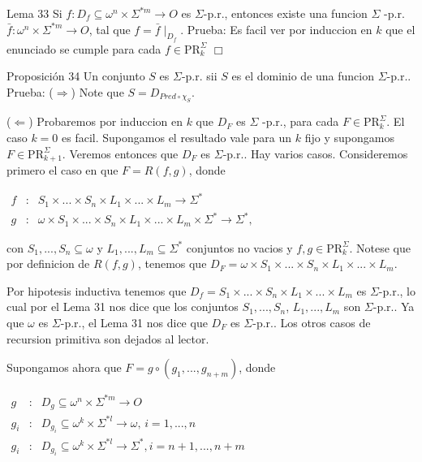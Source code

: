Lema 33 Si \(f:D_{f}\subseteq \omega ^{n}\times \Sigma ^{\ast m}\rightarrow O\) es \(\Sigma \)-p.r., entonces existe una funcion \(\Sigma \) -p.r. \(\bar{f}:\omega ^{n}\times \Sigma ^{\ast m}\rightarrow O\), tal que \(f= \bar{f}\mid _{D_{f}}\).
Prueba: Es facil ver por induccion en \(k\) que el enunciado se cumple para cada \(f\in \mathrm{PR}_{k}^{\Sigma }\) \(\Box\)

Proposición 34 Un conjunto \(S\) es \(\Sigma \)-p.r. sii \(S\) es el dominio de una funcion \(\Sigma \)-p.r.\(.\)
Prueba: (\(\Rightarrow \)) Note que \(S=D_{Pred\circ \chi _{S}}.\)

(\(\Leftarrow \)) Probaremos por induccion en \(k\) que \(D_{F}\) es \(\Sigma \) -p.r., para cada \(F\in \mathrm{PR}_{k}^{\Sigma }.\) El caso \(k=0\) es facil\(.\) Supongamos el resultado vale para un \(k\) fijo y supongamos \(F\in \mathrm{PR} _{k+1}^{\Sigma }.\) Veremos entonces que \(D_{F}\) es \(\Sigma \)-p.r.. Hay varios casos. Consideremos primero el caso en que \(F=R(f,g)\), donde

\(\displaystyle \begin{array}{rcl} f & :& S_{1}\times ...\times S_{n}\times L_{1}\times ...\times L_{m}\rightarrow \Sigma ^{\ast } \\ g & :& \omega \times S_{1}\times ...\times S_{n}\times L_{1}\times ...\times L_{m}\times \Sigma ^{\ast }\rightarrow \Sigma ^{\ast }, \end{array} \)

con \(S_{1},...,S_{n}\subseteq \omega \) y \(L_{1},...,L_{m}\subseteq \Sigma ^{\ast }\) conjuntos no vacios y \(f,g\in \mathrm{PR}_{k}^{\Sigma }\). Notese que por definicion de \(R(f,g)\), tenemos que
\(\displaystyle D_{F}=\omega \times S_{1}\times ...\times S_{n}\times L_{1}\times ...\times L_{m}. \)

Por hipotesis inductiva tenemos que \(D_{f}=S_{1}\times ...\times S_{n}\times L_{1}\times ...\times L_{m}\) es \(\Sigma \)-p.r., lo cual por el Lema 31 nos dice que los conjuntos \(S_{1},...,S_{n}\), \( L_{1},...,L_{m}\) son \(\Sigma \)-p.r.. Ya que \(\omega \) es \(\Sigma \)-p.r., el Lema 31 nos dice que \(D_{F}\) es \(\Sigma \)-p.r..
Los otros casos de recursion primitiva son dejados al lector.

Supongamos ahora que \(F=g\circ (g_{1},...,g_{n+m})\), donde

\(\displaystyle \begin{array}{rcl} g & :& D_{g}\subseteq \omega ^{n}\times \Sigma ^{\ast m}\rightarrow O \\ g_{i} & :& D_{g_{i}}\subseteq \omega ^{k}\times \Sigma ^{\ast l}\rightarrow \omega \text{, }i=1,...,n \\ g_{i} & :& D_{g_{i}}\subseteq \omega ^{k}\times \Sigma ^{\ast l}\rightarrow \Sigma ^{\ast },i=n+1,...,n+m \end{array} \)

